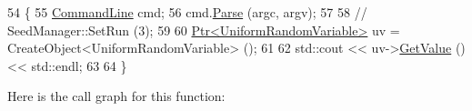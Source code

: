\begin{DoxyCode}
54 \{
55   \hyperlink{classns3_1_1CommandLine}{CommandLine} cmd;
56   cmd.\hyperlink{classns3_1_1CommandLine_a5c10b85b3207e5ecb48d907966923156}{Parse} (argc, argv);
57 
58   \textcolor{comment}{// SeedManager::SetRun (3);}
59 
60   \hyperlink{classns3_1_1Ptr}{Ptr<UniformRandomVariable>} uv = CreateObject<UniformRandomVariable> ();
61 
62   std::cout << uv->\hyperlink{classns3_1_1UniformRandomVariable_a03822d8c86ac51e9aa83bbc73041386b}{GetValue} () << std::endl;
63 
64 \}
\end{DoxyCode}


Here is the call graph for this function\+:


